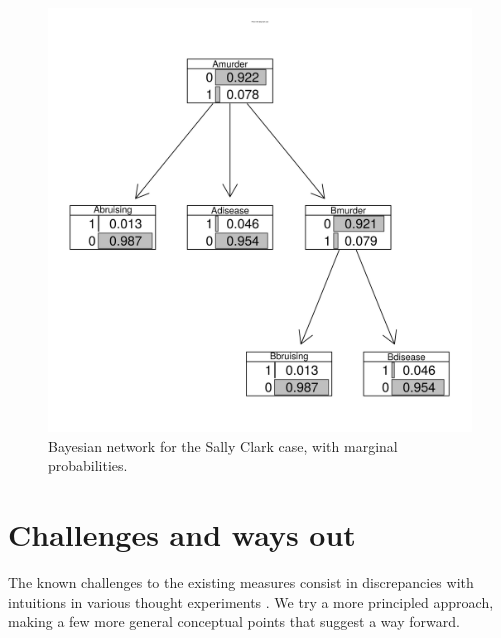 \documentclass[10pt,]{scrartcl}
\begin{document}
\begin{figure}[h]
\hspace{10mm}
\includegraphics[width =12cm]{SCBN.png}
\caption{Bayesian network for the Sally Clark case, with marginal probabilities.}
\label{fig:BeatlesBN}
\end{figure}





\section{Challenges and ways out}\label{sec:challenges}


The known challenges to the existing measures  consist in discrepancies with intuitions in various thought experiments \citep{Merricks1995,shogenji1999conducive, Akiba2000Shogenjis, Shogenji2001Reply, bovens2004bayesian,Siebel2004On-Fitelsons-me,siebel2006against,Shogenji2006Why,crupi2007BayesianMeasuresEvidential, koscholke2016evaluating, Schippers2019General}. We try a more principled approach,  making a few more general conceptual points that suggest a way forward. 
\end{document}
